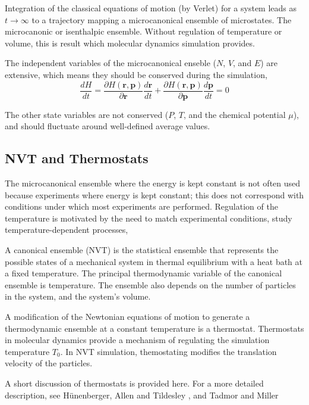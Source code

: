 Integration of the classical equations of motion (by Verlet) for a system leads as $t \rightarrow \infty$ to a trajectory mapping a microcanonical ensemble of microstates.  The microcanonic or isenthalpic ensemble.  Without regulation of temperature or volume, this is result which molecular dynamics simulation provides.

  The independent variables of the microcanonical enseble ($N$, $V$, and $E$) are extensive, which means they should be conserved during the simulation,
\begin{equation}
	\frac{dH}{dt}=\frac{\partial H(\bm{r},\bm{p})}{\partial \bm{r}} \frac{d\bm{r}}{dt}
							 +\frac{\partial H(\bm{r},\bm{p})}{\partial \bm{p}} \frac{d\bm{p}}{dt}=0
\end{equation}

  The other state variables are not conserved ($P$, $T$, and the chemical potential $\mu$), and should fluctuate around well-defined average values.


\subsection{NVT and Thermostats}
\label{sec:nvt_ensemble}
The microcanonical ensemble where the energy is kept constant is not often used because experiments where energy is kept constant; this does not correspond with conditions under which most experiments are performed.  Regulation of the temperature is motivated by the need to match experimental conditions, study temperature-dependent processes,

A canonical ensemble (NVT) is the statistical ensemble that represents the possible states of a mechanical system in thermal equilibrium with a heat bath at a fixed temperature.  The principal thermodynamic variable of the canonical ensemble is temperature.  The ensemble also depends on the number of particles in the system, and the system's volume.

A modification of the Newtonian equations of motion to generate a thermodynamic ensemble at a constant temperature is a thermostat.  Thermostats in molecular dynamics provide a mechanism of regulating the simulation temperature $T_0$.  In NVT simulation, themostating modifies the translation velocity of the particles.

A short discussion of thermostats is provided here.  For a more detailed description, see H\"{u}nenberger\cite{hunenberger2005_thermostats}, Allen and Tildesley \cite{allen1987_md}, and Tadmor and Miller \cite{tadmor2011_md}

